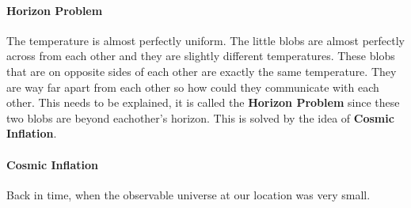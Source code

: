 \documentclass{article}
\begin{document}
\paragraph{Horizon Problem}
\label{par:horizon_problem}
The temperature is almost perfectly uniform. The little blobs are almost perfectly across from each other and they are slightly different temperatures. These blobs that are on opposite sides of each other are exactly the same temperature. They are way far apart from each other so how could they communicate with each other. This needs to be explained, it is called the \textbf{Horizon Problem} since these two blobs are beyond eachother's horizon. This is solved by the idea of \textbf{Cosmic Inflation}.

\paragraph{Cosmic Inflation}
\label{par:cosmic_inflation}
Back in time, when the observable universe at our location was very small.
\end{document}
